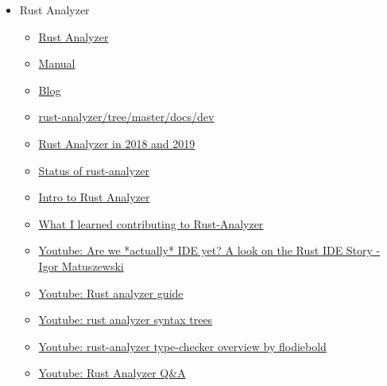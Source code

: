\documentclass[12pt, a4paper]{report}
\begin{document}
\begin{itemize}[noitemsep]
  \item Rust Analyzer
    \begin{itemize}[noitemsep]
    \item \href{https://rust-analyzer.github.io/}{\Square Rust Analyzer}
    \item \href{https://rust-analyzer.github.io/manual.html}{\Square Manual}
    \item \href{https://rust-analyzer.github.io/blog}{\Square Blog}
    \item \href{https://github.com/rust-analyzer/rust-analyzer/tree/master/docs/dev}{\Square rust-analyzer/tree/master/docs/dev}
    \item \href{https://ferrous-systems.com/blog/rust-analyzer-2019/}{\Square Rust Analyzer in 2018 and 2019}
    \item \href{https://ferrous-systems.com/blog/rust-analyzer-status-opencollective/}{\Square Status of rust-analyzer}
    \item \href{https://blog.logrocket.com/intro-to-rust-analyzer/}{ Intro to Rust Analyzer}
    \item \href{https://dev.to/bnjjj/what-i-learned-contributing-to-rust-analyzer-4c7e}{ What I learned contributing to Rust-Analyzer}
    \item \href{https://www.youtube.com/watch?v=7_7ckOKZCJE}{\Square Youtube: Are we *actually* IDE yet? A look on the Rust IDE Story - Igor Matuszewski}
    \item \href{https://www.youtube.com/watch?v=ANKBNiSWyfc}{\Square Youtube: Rust analyzer guide}
    \item \href{https://www.youtube.com/watch?v=DGAuLWdCCAI}{\CheckedBox Youtube: rust analyzer syntax trees}
    \item \href{https://www.youtube.com/watch?v=Lmp3P9WNL8o}{\CheckedBox Youtube: rust-analyzer type-checker overview by flodiebold}
    \item \href{https://www.youtube.com/playlist?list=PLXajQV_H-DxLMBt0amcuxgTeOTj6L-YGl}{\Square Youtube: Rust Analyzer Q\&A}

    \end{itemize}


\end{itemize}
\end{document}
